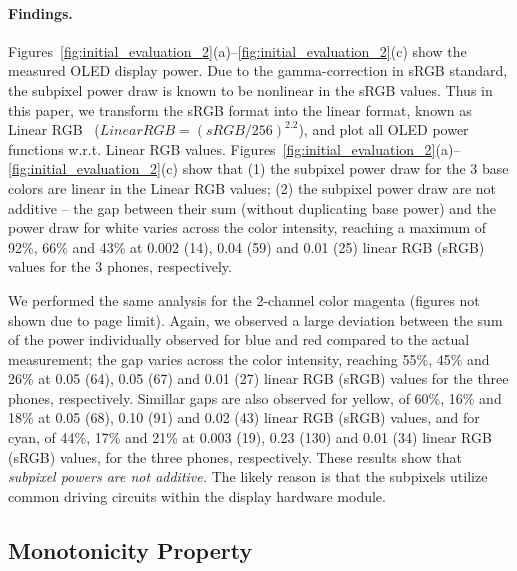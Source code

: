 \paragraph{Findings.}
{
Figures~\ref{fig:initial_evaluation_2}(a)--\ref{fig:initial_evaluation_2}(c)
show the measured OLED display power. Due to the gamma-correction in sRGB standard,
the subpixel power draw is known to be nonlinear in the sRGB values.
Thus in this paper, we transform the sRGB format into the linear format, known as Linear RGB~\cite{gammaCorrection1} ({$Linear RGB = (sRGB/256)^{2.2}$}),
and plot all OLED power functions w.r.t. Linear RGB values.
Figures~\ref{fig:initial_evaluation_2}(a)--\ref{fig:initial_evaluation_2}(c) show that
(1) the subpixel power draw for the 3 base colors are linear in the Linear RGB values;
(2) the subpixel power draw are not additive -- 
the gap between their sum (without duplicating base power)
and the power draw for white
varies across the color intensity, reaching
a maximum of 92\%, 66\% and 43\% at
0.002 (14), 0.04 (59) and 0.01 (25) linear RGB (sRGB) values for the 3 phones, respectively.


We performed the same analysis for the 2-channel color magenta
(figures not shown due to page limit). Again, we
observed a large deviation between the sum of the power individually observed for blue and
red compared to the actual measurement; the gap
varies across the color intensity, reaching
55\%, 45\% and 26\% at 0.05 (64), 0.05 (67) and 0.01 (27) linear RGB (sRGB) values 
for the three phones, respectively.
Simillar gaps are also observed for yellow, \eg of
60\%, 16\% and 18\% at 0.05 (68), 0.10 (91) and 0.02 (43) linear RGB (sRGB) values,
and for cyan, of
44\%, 17\% and 21\% at 0.003 (19), 0.23 (130) and 0.01 (34) linear RGB  (sRGB) values,
for the three phones, respectively.
These results show that
%
{\em subpixel powers are not additive.} The likely reason is that the
  subpixels utilize common driving circuits within the display
  hardware module.
}
  
\subsection{Monotonicity Property}
\label{subsec:monoproperty}

